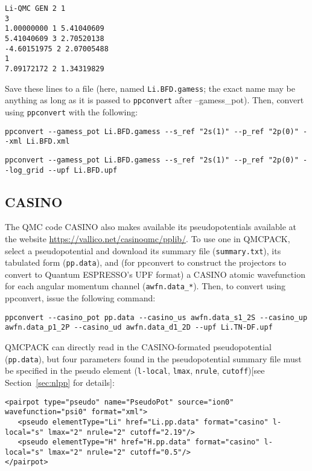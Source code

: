 \begin{lstlisting}[caption=BFD Li pseudopotential in GAMESS format]
Li-QMC GEN 2 1
3
1.00000000 1 5.41040609
5.41040609 3 2.70520138
-4.60151975 2 2.07005488
1
7.09172172 2 1.34319829
\end{lstlisting}
Save these lines to a file (here, named \texttt{Li.BFD.gamess}; the exact name may be anything as long as it is passed to \texttt{ppconvert} after --gamess\_pot).  Then, convert using \texttt{ppconvert} with the following:
\begin{lstlisting}[caption=Convert GAMESS-formatted pseudopotential to FSAtom xml format]
  ppconvert --gamess_pot Li.BFD.gamess --s_ref "2s(1)" --p_ref "2p(0)" --xml Li.BFD.xml
\end{lstlisting}
\begin{lstlisting}[caption=Convert GAMESS-formatted pseudopotential to Quantum ESPRESSO UPF format]
  ppconvert --gamess_pot Li.BFD.gamess --s_ref "2s(1)" --p_ref "2p(0)" --log_grid --upf Li.BFD.upf
\end{lstlisting}

\subsection{CASINO}
\label{subsec:CASINO}
The QMC code CASINO also makes available its pseudopotentials available at the website \url{https://vallico.net/casinoqmc/pplib/}. To use one in QMCPACK, select a pseudopotential and download its summary file (\texttt{summary.txt}), its tabulated form (\texttt{pp.data}), and (for ppconvert to construct the projectors to convert to Quantum ESPRESSO's UPF format) a CASINO atomic wavefunction for each angular momentum channel (\texttt{awfn.data\_*}).  Then, to convert using ppconvert, issue the following command:
\begin{lstlisting}[caption=Convert CASINO-formatted pseudopotential to Quantum ESPRESSO UPF format]
ppconvert --casino_pot pp.data --casino_us awfn.data_s1_2S --casino_up awfn.data_p1_2P --casino_ud awfn.data_d1_2D --upf Li.TN-DF.upf
\end{lstlisting}
QMCPACK can directly read in the CASINO-formated pseudopotential (\texttt{pp.data}), but four parameters found in the pseudopotential summary file must be specified in the pseudo element (\texttt{l-local}, \texttt{lmax}, \texttt{nrule}, \texttt{cutoff})[see Section~\ref{sec:nlpp} for details]:
\begin{lstlisting}[style=XML,caption=XML syntax to use CASINO-formatted pseudopotentials in QMCPACK]
<pairpot type="pseudo" name="PseudoPot" source="ion0" wavefunction="psi0" format="xml">
   <pseudo elementType="Li" href="Li.pp.data" format="casino" l-local="s" lmax="2" nrule="2" cutoff="2.19"/>
   <pseudo elementType="H" href="H.pp.data" format="casino" l-local="s" lmax="2" nrule="2" cutoff="0.5"/>
</pairpot>
\end{lstlisting}
